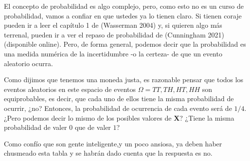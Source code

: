 \documentclass[
  letterpaper,
  DIV=11,
  numbers=noendperiod,
  oneside]{scrreprt}
\begin{document}
El concepto de probabilidad es algo complejo, pero, como esto no es un
curso de probabilidad, vamos a confiar en que ustedes ya lo tienen
claro. Si tienen coraje pueden ir a leer el capítulo 1 de (Wasserman
2004)
y, si quieren algo más terrenal, pueden ir a ver el repaso de
probabilidad de (Cunningham
2021)
(disponible online). Pero, de forma general, podemos decir que la
probabilidad es una medida numérica de la incertidumbre -o la certeza-
de que un evento aleatorio ocurra.

Como dijimos que tenemos una moneda justa, es razonable pensar que todos
los eventos aleatorios en este espacio de eventos
\(\Omega = {TT, TH, HT, HH}\) son equiprobables, es decir, que cada uno
de ellos tiene la misma probabilidad de ocurrir, ¿no? Entonces, la
probabilidad de ocurrencia de cada evento será de \(1/4\). ¿Pero
podemos decir lo mismo de los posibles valores de \textbf{X}? ¿Tiene la
misma probabilidad de valer \(0\) que de valer \(1\)?

Como confío que son gente inteligente,y un poco ansiosa, ya deben haber
chusmeado esta tabla y se habrán dado cuenta que la respuesta es no.
\end{document}
